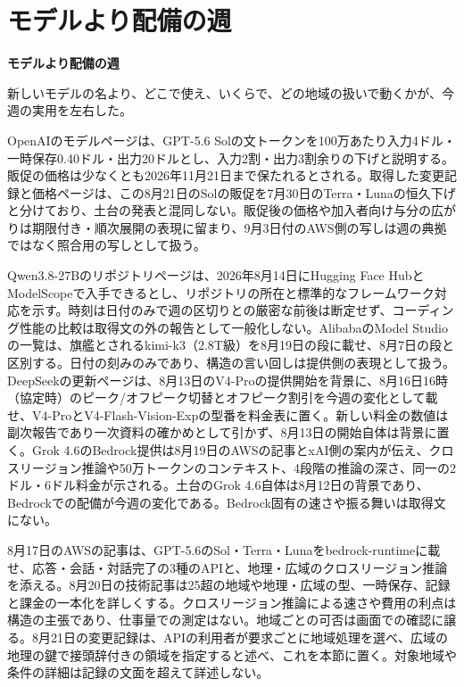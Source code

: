 \section{モデルより配備の週}
\begin{wideflow}
{\Large\bfseries モデルより配備の週}\par
\smallskip
{\color{SurveyMuted}新しいモデルの名より、どこで使え、いくらで、どの地域の扱いで動くかが、今週の実用を左右した。}\par
\end{wideflow}

\noindent OpenAIのモデルページは、GPT-5.6 Solの文トークンを100万あたり入力4ドル・一時保存0.40ドル・出力20ドルとし、入力2割・出力3割余りの下げと説明する。販促の価格は少なくとも2026年11月21日まで保たれるとされる。取得した変更記録と価格ページは、この8月21日のSolの販促を7月30日のTerra・Lunaの恒久下げと分けており、土台の発表と混同しない。販促後の価格や加入者向け与分の広がりは期限付き・順次展開の表現に留まり、9月3日付のAWS側の写しは週の典拠ではなく照合用の写しとして扱う。 \cite{w2026w34w34eventc017}\par\medskip

\noindent Qwen3.8-27Bのリポジトリページは、2026年8月14日にHugging Face HubとModelScopeで入手できるとし、リポジトリの所在と標準的なフレームワーク対応を示す。時刻は日付のみで週の区切りとの厳密な前後は断定せず、コーディング性能の比較は取得文の外の報告として一般化しない。AlibabaのModel Studioの一覧は、旗艦とされるkimi-k3（2.8T級）を8月19日の段に載せ、8月7日の段と区別する。日付の刻みのみであり、構造の言い回しは提供側の表現として扱う。DeepSeekの更新ページは、8月13日のV4-Proの提供開始を背景に、8月16日16時（協定時）のピーク/オフピーク切替とオフピーク割引を今週の変化として載せ、V4-ProとV4-Flash-Vision-Expの型番を料金表に置く。新しい料金の数値は副次報告であり一次資料の確かめとして引かず、8月13日の開始自体は背景に置く。Grok 4.6のBedrock提供は8月19日のAWSの記事とxAI側の案内が伝え、クロスリージョン推論や50万トークンのコンテキスト、4段階の推論の深さ、同一の2ドル・6ドル料金が示される。土台のGrok 4.6自体は8月12日の背景であり、Bedrockでの配備が今週の変化である。Bedrock固有の速さや振る舞いは取得文にない。 \cite{w2026w34w34eventc039,w2026w34w34eventgapalibabakimik3modelstudio,w2026w34w34eventc040,w2026w34w34eventc023}\par\medskip

\noindent 8月17日のAWSの記事は、GPT-5.6のSol・Terra・Lunaをbedrock-runtimeに載せ、応答・会話・対話完了の3種のAPIと、地理・広域のクロスリージョン推論を添える。8月20日の技術記事は25超の地域や地理・広域の型、一時保存、記録と課金の一本化を詳しくする。クロスリージョン推論による速さや費用の利点は構造の主張であり、仕事量での測定はない。地域ごとの可否は画面での確認に譲る。8月21日の変更記録は、APIの利用者が要求ごとに地域処理を選べ、広域の地理の鍵で接頭辞付きの領域を指定すると述べ、これを本節に置く。対象地域や条件の詳細は記録の文面を超えて詳述しない。 \cite{w2026w34w34eventc030,w2026w34w34eventc045}\par\medskip

